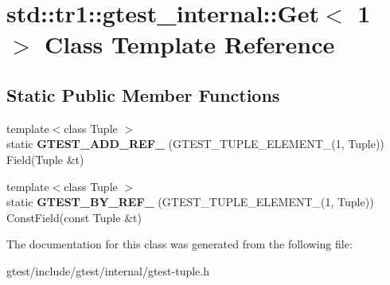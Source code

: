 \hypertarget{classstd_1_1tr1_1_1gtest__internal_1_1Get_3_011_01_4}{}\section{std\+:\+:tr1\+:\+:gtest\+\_\+internal\+:\+:Get$<$ 1 $>$ Class Template Reference}
\label{classstd_1_1tr1_1_1gtest__internal_1_1Get_3_011_01_4}
\subsection*{Static Public Member Functions}
\begin{DoxyCompactItemize}
\item 
\mbox{\label{classstd_1_1tr1_1_1gtest__internal_1_1Get_3_011_01_4_a52b2f5d2bc283d76a3e8dede84dba154}} 
{\footnotesize template$<$class Tuple $>$ }\\static {\bfseries G\+T\+E\+S\+T\+\_\+\+A\+D\+D\+\_\+\+R\+E\+F\+\_\+} (G\+T\+E\+S\+T\+\_\+\+T\+U\+P\+L\+E\+\_\+\+E\+L\+E\+M\+E\+N\+T\+\_\+(1, Tuple)) Field(Tuple \&t)
\item 
\mbox{\label{classstd_1_1tr1_1_1gtest__internal_1_1Get_3_011_01_4_a481a2bf839c758408d46a1d0d41ff8f4}} 
{\footnotesize template$<$class Tuple $>$ }\\static {\bfseries G\+T\+E\+S\+T\+\_\+\+B\+Y\+\_\+\+R\+E\+F\+\_\+} (G\+T\+E\+S\+T\+\_\+\+T\+U\+P\+L\+E\+\_\+\+E\+L\+E\+M\+E\+N\+T\+\_\+(1, Tuple)) Const\+Field(const Tuple \&t)
\end{DoxyCompactItemize}


The documentation for this class was generated from the following file\+:\begin{DoxyCompactItemize}
\item 
gtest/include/gtest/internal/gtest-\/tuple.\+h\end{DoxyCompactItemize}
